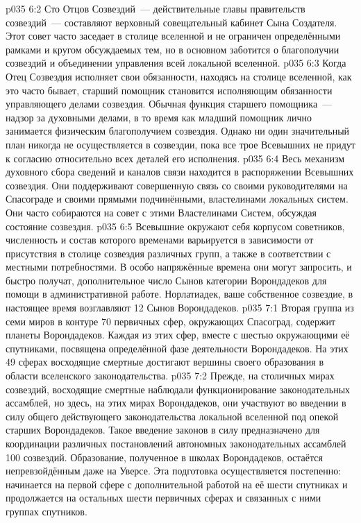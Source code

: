 \vs p035 6:2 Сто Отцов Созвездий~--- действительные главы правительств созвездий~--- составляют верховный совещательный кабинет Сына Создателя. Этот совет часто заседает в столице вселенной и не ограничен определёнными рамками и кругом обсуждаемых тем, но в основном заботится о благополучии созвездий и объединении управления всей локальной вселенной.
\vs p035 6:3 Когда Отец Созвездия исполняет свои обязанности, находясь на столице вселенной, как это часто бывает, старший помощник становится исполняющим обязанности управляющего делами созвездия. Обычная функция старшего помощника~--- надзор за духовными делами, в то время как младший помощник лично занимается физическим благополучием созвездия. Однако ни один значительный план никогда не осуществляется в созвездии, пока все трое Всевышних не придут к согласию относительно всех деталей его исполнения.
\vs p035 6:4 Весь механизм духовного сбора сведений и каналов связи находится в распоряжении Всевышних созвездия. Они поддерживают совершенную связь со своими руководителями на Спасограде и своими прямыми подчинёнными, властелинами локальных систем. Они часто собираются на совет с этими Властелинами Систем, обсуждая состояние созвездия.
\vs p035 6:5 Всевышние окружают себя корпусом советников, численность и состав которого временами варьируется в зависимости от присутствия в столице созвездия различных групп, а также в соответствии с местными потребностями. В особо напряжённые времена они могут запросить, и быстро получат, дополнительное число Сынов категории Ворондадеков для помощи в административной работе. Норлатиадек, ваше собственное созвездие, в настоящее время возглавляют 12 Сынов Ворондадеков.
\vs p035 7:1 Вторая группа из семи миров в контуре 70 первичных сфер, окружающих Спасоград, содержит планеты Ворондадеков. Каждая из этих сфер, вместе с шестью окружающими её спутниками, посвящена определённой фазе деятельности Ворондадеков. На этих 49 сферах восходящие смертные достигают вершины своего образования в области вселенского законодательства.
\vs p035 7:2 Прежде, на столичных мирах созвездий, восходящие смертные наблюдали функционирование законодательных ассамблей, но здесь, на этих мирах Ворондадеков, они участвуют во введении в силу общего действующего законодательства локальной вселенной под опекой старших Ворондадеков. Такое введение законов в силу предназначено для координации различных постановлений автономных законодательных ассамблей 100 созвездий. Образование, полученное в школах Ворондадеков, остаётся непревзойдённым даже на Уверсе. Эта подготовка осуществляется постепенно: начинается на первой сфере с дополнительной работой на её шести спутниках и продолжается на остальных шести первичных сферах и связанных с ними группах спутников.
